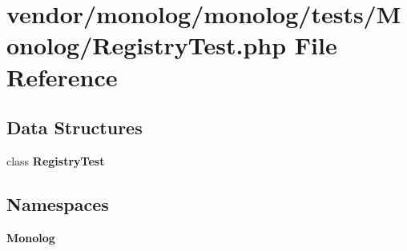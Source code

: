 \section{vendor/monolog/monolog/tests/\+Monolog/\+Registry\+Test.php File Reference}
\label{_registry_test_8php}
\subsection*{Data Structures}
\begin{DoxyCompactItemize}
\item 
class {\bf Registry\+Test}
\end{DoxyCompactItemize}
\subsection*{Namespaces}
\begin{DoxyCompactItemize}
\item 
 {\bf Monolog}
\end{DoxyCompactItemize}

